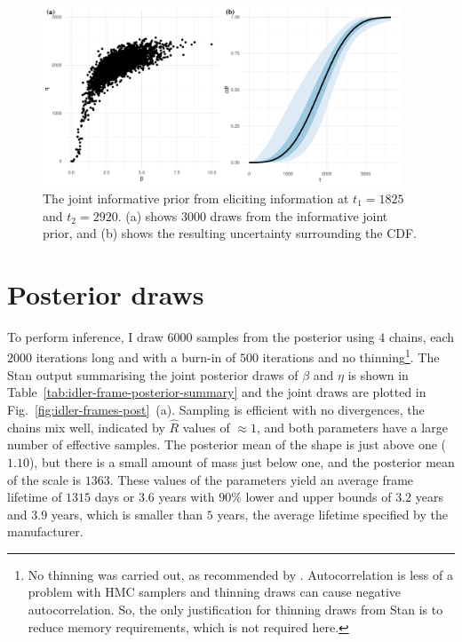 \begin{figure}[tbp]
  \centering
  \includegraphics[width=0.95\textwidth]{./figures/ch-3/idler-frame-prior.pdf}
  \caption{The joint informative prior from eliciting information at $t_1 = 1825$ and $t_2 = 2920$. (a) shows 3000 draws from the informative joint prior, and (b) shows the resulting uncertainty surrounding the CDF.}
  \label{fig:idler-frames-prior}
\end{figure}

\section{Posterior draws} \label{sec:idler-frame-posterior}

To perform inference, I draw $6000$ samples from the posterior using $4$ chains, each $2000$ iterations long and with a burn-in of $500$ iterations and no thinning\footnote{No thinning was carried out, as recommended by \citet[Sec.~16.4]{Stan2024}. Autocorrelation is less of a problem with HMC samplers and thinning draws can cause negative autocorrelation. So, the only justification for thinning draws from Stan is to reduce memory requirements, which is not required here.}. The Stan output summarising the joint posterior draws of $\beta$ and $\eta$ is shown in Table~\ref{tab:idler-frame-posterior-summary} and the joint draws are plotted in Fig.~\ref{fig:idler-frames-post}~(a). Sampling is efficient with no divergences, the chains mix well, indicated by $\hat{R}$ values of $\approx 1$, and both parameters have a large number of effective samples. The posterior mean of the shape is just above one ($1.10$), but there is a small amount of mass just below one, and the posterior mean of the scale is $1363$. These values of the parameters yield an average frame lifetime of $1315$ days or $3.6$ years with $90\%$ lower and upper bounds of $3.2$ years and $3.9$ years, which is smaller than $5$ years, the average lifetime  specified by the manufacturer.

